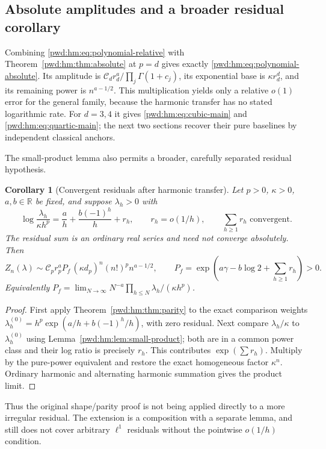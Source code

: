 \documentclass[11pt,letterpaper]{article}
\numberwithin{equation}{section}
\newtheorem{corollary}[theorem]{Corollary}
\theoremstyle{remark}\newtheorem{remark}[theorem]{Remark}
\begin{document}
\subsection{Absolute amplitudes and a broader residual corollary}
Combining \eqref{pwd:hm:eq:polynomial-relative} with Theorem~\ref{pwd:hm:thm:absolute} at $p=d$ gives exactly \eqref{pwd:hm:eq:polynomial-absolute}. Its amplitude is $\mathcal{C}_dr_d^a/\prod_j\Gamma(1+c_j)$, its exponential base is $\kappa r_d^d$, and its remaining power is $n^{a-1/2}$. This multiplication yields only a relative $o(1)$ error for the general family, because the harmonic transfer has no stated logarithmic rate. For $d=3,4$ it gives \eqref{pwd:hm:eq:cubic-main} and \eqref{pwd:hm:eq:quartic-main}; the next two sections recover their pure baselines by independent classical anchors.

The small-product lemma also permits a broader, carefully separated residual hypothesis.
\begin{corollary}[Convergent residuals after harmonic transfer]\label{pwd:hm:cor:broad-residual}
Let $p>0$, $\kappa>0$, $a,b\in\mathbb R$ be fixed, and suppose $\lambda_h>0$ with
\[
 \log\frac{\lambda_h}{\kappa h^p}=\frac ah+\frac{b(-1)^h}{h}+r_h,
 \qquad r_h=o(1/h),\qquad\sum_{h\ge1}r_h\text{ convergent}.
\]
The residual sum is an ordinary real series and need not converge absolutely. Then
\begin{equation}\label{pwd:hm:eq:broad-absolute}
 Z_n(\lambda)\sim \mathcal{C}_pr_p^aP_f\,(\kappa d_p)^n(n!)^pn^{a-1/2},
 \qquad P_f=\exp\left(a\gamma-b\log2+\sum_{h\ge1}r_h\right)>0.
\end{equation}
Equivalently $P_f=\lim_{N\to\infty}N^{-a}\prod_{h\le N}\lambda_h/(\kappa h^p)$.
\end{corollary}
\begin{proof}
First apply Theorem~\ref{pwd:hm:thm:parity} to the exact comparison weights
$\lambda_h^{(0)}=h^p\exp(a/h+b(-1)^h/h)$, with zero residual. Next compare $\lambda_h/\kappa$ to $\lambda_h^{(0)}$ using Lemma~\ref{pwd:hm:lem:small-product}; both are in a common power class and their log ratio is precisely $r_h$. This contributes $\exp(\sum r_h)$. Multiply by the pure-power equivalent and restore the exact homogeneous factor $\kappa^n$. Ordinary harmonic and alternating harmonic summation gives the product limit.
\end{proof}
Thus the original shape/parity proof is not being applied directly to a more irregular residual. The extension is a composition with a separate lemma, and still does not cover arbitrary $\ell^1$ residuals without the pointwise $o(1/h)$ condition.
\end{document}

